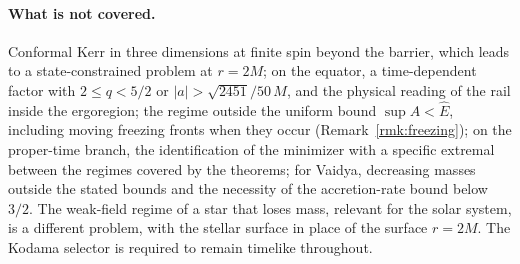 \documentclass[aip,jmp,amsmath,amssymb,reprint]{revtex4-2}
\newcommand{\Ehat}{\hat E}
\theoremstyle{plain}
\theoremstyle{definition}
\begin{document}
\paragraph{What is not covered.} Conformal Kerr in three dimensions at finite spin beyond the barrier,
which leads to a state-constrained problem at $r=2M$; on the equator, a time-dependent factor with
$2\le q<5/2$ or $|a|>\sqrt{2451}/50\,M$, and the physical reading of the rail inside the ergoregion; the regime outside the uniform bound $\sup A<\Ehat$, including moving freezing fronts when they occur
(Remark~\ref{rmk:freezing});
on the proper-time branch, the identification of the minimizer with a specific extremal between the
regimes covered by the theorems; for Vaidya, decreasing masses outside the stated bounds and the
necessity of the accretion-rate bound below $3/2$. The weak-field regime of a star that loses mass,
relevant for the solar system, is a different problem, with the stellar surface in place of
the surface $r=2M$. The Kodama selector is required to remain timelike throughout.
\end{document}
